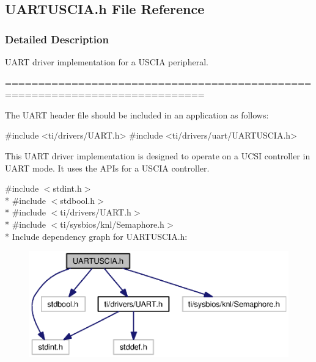 \subsection{U\+A\+R\+T\+U\+S\+C\+I\+A.\+h File Reference}
\label{_u_a_r_t_u_s_c_i_a_8h}


\subsubsection{Detailed Description}
U\+A\+R\+T driver implementation for a U\+S\+C\+I\+A peripheral. 

============================================================================

The U\+A\+R\+T header file should be included in an application as follows\+: 
\begin{DoxyCode}
\textcolor{preprocessor}{#include <ti/drivers/UART.h>}
\textcolor{preprocessor}{#include <ti/drivers/uart/UARTUSCIA.h>}
\end{DoxyCode}


This U\+A\+R\+T driver implementation is designed to operate on a U\+C\+S\+I controller in U\+A\+R\+T mode. It uses the A\+P\+Is for a U\+S\+C\+I\+A controller. 

{\ttfamily \#include $<$stdint.\+h$>$}\\*
{\ttfamily \#include $<$stdbool.\+h$>$}\\*
{\ttfamily \#include $<$ti/drivers/\+U\+A\+R\+T.\+h$>$}\\*
{\ttfamily \#include $<$ti/sysbios/knl/\+Semaphore.\+h$>$}\\*
Include dependency graph for U\+A\+R\+T\+U\+S\+C\+I\+A.\+h\+:
\nopagebreak
\begin{figure}[H]
\begin{center}
\leavevmode
\includegraphics[width=350pt]{_u_a_r_t_u_s_c_i_a_8h__incl}
\end{center}
\end{figure}
